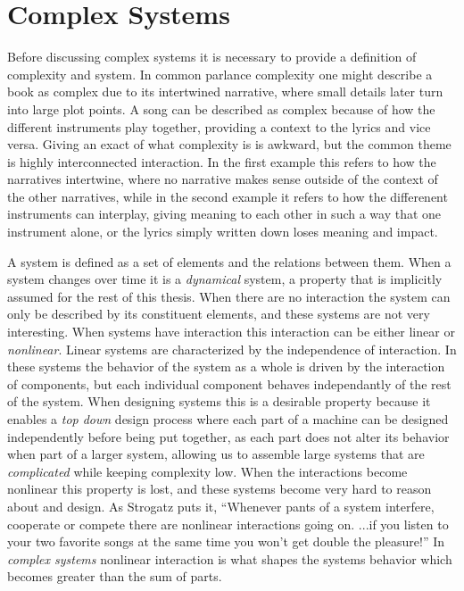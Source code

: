 \section{Complex Systems}
%
Before discussing complex systems it is necessary to provide a definition of
complexity and system.
In common parlance complexity one might describe a book as complex due to its
intertwined narrative, where small details later turn into large plot points.
A song can be described as complex because of how the different instruments play
together, providing a context to the lyrics and vice versa.
Giving an exact of what complexity is is awkward, but the common theme is
highly interconnected interaction.
In the first example this refers to how the narratives intertwine, where no
narrative makes sense outside of the context of the other narratives, while in
the second example it refers to how the differenent instruments can interplay,
giving meaning to each other in such a way that one instrument alone, or the
lyrics simply written down loses meaning and impact.
\par
%
A system is defined as a set of elements and the relations between them.
When a system changes over time it is a \emph{dynamical} system, a property that
is implicitly assumed for the rest of this thesis.
When there are no interaction the system can only be described by its
constituent elements, and these systems are not very interesting.
When systems have interaction this interaction can be either linear or
\emph{nonlinear}.
Linear systems are characterized by the independence of interaction.
In these systems the behavior of the system as a whole is driven by the
interaction of components, but each individual component behaves independantly
of the rest of the system.
When designing systems this is a desirable property because it enables a
\emph{top down} design process where each part of a machine can be designed
independently before being put together, as each part does not alter its
behavior when part of a larger system, allowing us to assemble large systems
that are \emph{complicated} while keeping complexity low.
When the interactions become nonlinear this property is lost, and these systems
become very hard to reason about and design.
As Strogatz puts it, ``Whenever pants of a system interfere, cooperate or
compete there are nonlinear interactions going on. ...if you listen to your two
favorite songs at the same time you won't get double the pleasure!''
\cite{strogatz_nonlinear_2014}
In \emph{complex systems} nonlinear interaction is what shapes the systems
behavior which becomes greater than the sum of parts.
%
